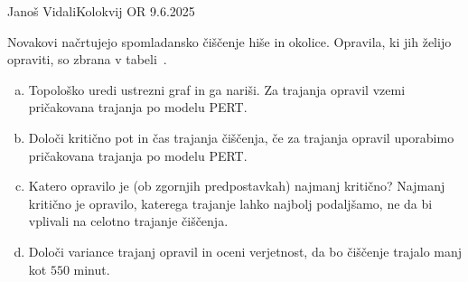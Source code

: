 \begin{naloga}{Janoš Vidali}{Kolokvij OR 9.6.2025}
\begin{vprasanje}
Novakovi načrtujejo spomladansko čiščenje hiše in okolice.
Opravila, ki jih želijo opraviti, so zbrana v tabeli~\tab.

\begin{enumerate}[(a)]
\item Topološko uredi ustrezni graf in ga nariši.
Za trajanja opravil vzemi pričakovana trajanja po modelu PERT.

\item Določi kritično pot in čas trajanja čiščenja,
če za trajanja opravil uporabimo pričakovana trajanja po modelu PERT.

\item Katero opravilo je (ob zgornjih predpostavkah) najmanj kritično?
Najmanj kritično je opravilo, katerega trajanje lahko najbolj podaljšamo,
ne da bi vplivali na celotno trajanje čiščenja.

\item Določi variance trajanj opravil in oceni ve\-rjet\-nost,
da bo čiščenje trajalo manj kot $550$ minut.
\end{enumerate}
%
\begin{tabela}
\end{tabela}
\end{vprasanje}


\end{naloga}
